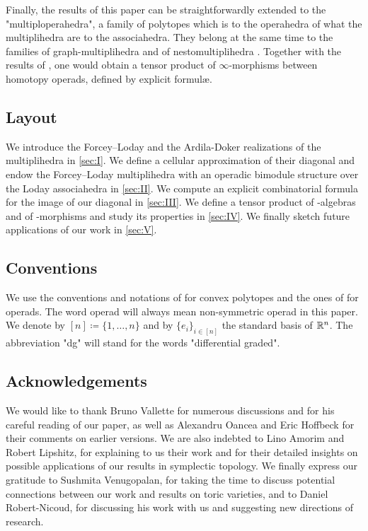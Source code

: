 \documentclass[twoside, 11pt]{amsart}
\theoremstyle{remark}
\begin{document}

Finally, the results of this paper can be straightforwardly extended to the "multiploperahedra", a family of polytopes which is to the operahedra of \cite{LA21} what the multiplihedra are to the associahedra. 
They belong at the same time to the families of graph-multiplihedra \cite{DevadossForcey08} and of nestomultiplihedra \cite{AD13}.  
Together with the results of \cite[Section 4]{LA21}, one would obtain a tensor product of $\infty$-morphisms between homotopy operads, defined by explicit formul\ae. 

\subsection*{Layout} 
We introduce the Forcey--Loday and the Ardila-Doker realizations of the multiplihedra in \cref{sec:I}. 
We define a cellular approximation of their diagonal and endow the Forcey--Loday multiplihedra with an operadic bimodule structure over the Loday associahedra in \cref{sec:II}.
We compute an explicit combinatorial formula for the image of our diagonal in \cref{sec:III}. 
We define a tensor product of \Ainf -algebras and of \Ainf -morphisms and study its properties in \cref{sec:IV}.
We finally sketch future applications of our work in \cref{sec:V}.

\subsection*{Conventions} 
We use the conventions and notations of \cite{Ziegler95} for convex polytopes and the ones of \cite{LodayVallette12} for operads. 
The word operad will always mean non-symmetric operad \cite[Section 5.2.8]{LodayVallette12} in this paper. 
We denote by $[n]\coloneqq \{1,\ldots,n\}$ and by $\{ e_i\}_{i \in [n]}$ the standard basis of $\mathbb{R}^n$.
The abbreviation "dg" will stand for the words "differential graded". 

\subsection*{Acknowledgements} 
We would like to thank Bruno Vallette for numerous discussions and for his careful reading of our paper, as well as Alexandru Oancea and Eric Hoffbeck for their comments on earlier versions.
We are also indebted to Lino Amorim and Robert Lipshitz, for explaining to us their work and for their detailed insights on possible applications of our results in symplectic topology. 
We finally express our gratitude to Sushmita Venugopalan, for taking the time to discuss potential connections between our work and results on toric varieties, and to Daniel Robert-Nicoud, for discussing his work with us and suggesting new directions of research. 
\end{document}
